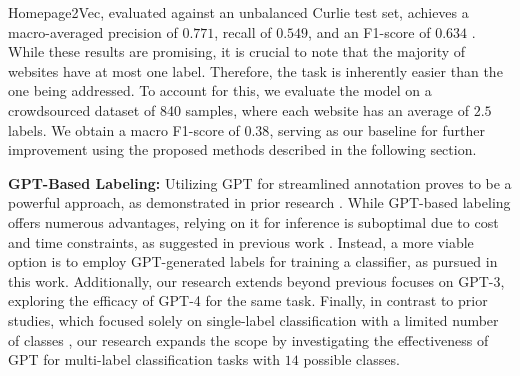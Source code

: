 Homepage2Vec, evaluated against an unbalanced Curlie test set, achieves a macro-averaged precision of $0.771$, recall of $0.549$, and an F1-score of $0.634$ \cite{homepage2vec}. While these results are promising, it is crucial to note that the majority of websites have at most one label. Therefore, the task is inherently easier than the one being addressed. To account for this, we evaluate the model on a crowdsourced dataset of 840 samples, where each website has an average of $2.5$ labels. We obtain a macro F1-score of $0.38$, serving as our baseline for further improvement using the proposed methods described in the following section.


\textbf{GPT-Based Labeling:} Utilizing GPT for streamlined annotation proves to be a powerful approach, as demonstrated in prior research \cite{reduce-labeling-cost, prompt-tuning, is-gpt3-good-annot, annollm}. While GPT-based labeling offers numerous advantages, relying on it for inference is suboptimal due to cost and time constraints, as suggested in previous work \cite{reduce-labeling-cost, is-gpt3-good-annot}. Instead, a more viable option is to employ GPT-generated labels for training a classifier, as pursued in this work. Additionally, our research extends beyond previous focuses on GPT-3, exploring the efficacy of GPT-4 for the same task. Finally, in contrast to prior studies, which focused solely on single-label classification with a limited number of classes \cite{reduce-labeling-cost, is-gpt3-good-annot}, our research expands the scope by investigating the effectiveness of GPT for multi-label classification tasks with $14$ possible classes.
